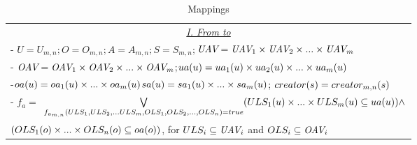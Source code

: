 \renewcommand{\suffix}{m,n}
\newcommand{\suffixT}{1,1}
\begin{table}
	\centering
	\caption{ Mappings } %
	\label{tab:lp11-to-lpmn}
	\begin{tabular}{|l|}						
		\hline					
				 
		   
		   \multicolumn{1}{|c|}{\underline{\textit{I. From \LPMN{} to \LPOneOne{}}}}\\	
			   - $U = U_{\suffix}; O = O_{\suffix}; A = A_{\suffix}; S = S_{\suffix};$$\textit{UAV} = \textit{UAV}_{1} \times \textit{UAV}_{2}\times ... \times \textit{UAV}_{m}$\\
			   -  $\textit{OAV} = \textit{OAV}_{1} \times \textit{OAV}_{2}\times ... \times \textit{OAV}_{m}$;$ua(u) = ua_{1}(u) \times ua_{2}(u) \times ... \times ua_{m}(u) $\\
			   -$oa(u) = oa_{1}(u) \times  ... \times oa_{m}(u) $$sa(u) = sa_{1}(u) \times ... \times sa_{m}(u) $; $\creator(s) = \creator_{\suffix}(s)$\\
			    - $ f_a =$ $\mathop{\bigvee}\limits_{ f_{a_{m,n}}( ULS_{1}, ULS_{2},...ULS_{m}, OLS_{1}, OLS_{2}, ...,OLS_{n})=true }  (ULS_{1}(u) \times ... \times ULS_{m}(u) \subseteq ua(u) )\land$ \\ \hfill  $(OLS_{1}(o) \times ... \times OLS_{n}(o) \subseteq oa(o))$, for $ULS_{i} \subseteq \textit{UAV}_{i}$ and $OLS_{i} \subseteq \textit{OAV}_{i}$ \\ 		
			   

\end{tabular}
\end{table}
